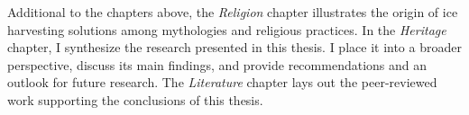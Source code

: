 Additional to the chapters above, the \textit{Religion} chapter illustrates the origin of ice harvesting solutions among
mythologies and religious practices. In the \textit{Heritage} chapter, I synthesize the research presented in this
thesis. I place it into a broader perspective, discuss its main findings, and provide recommendations and an
outlook for future research. The \textit{Literature} chapter lays out the peer-reviewed work supporting the conclusions of this
thesis.



